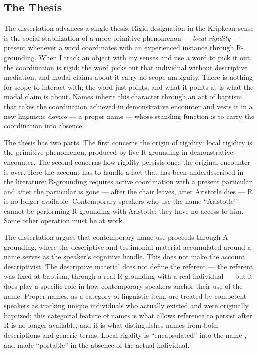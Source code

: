 \documentclass[12pt,a4paper]{article}
\begin{document}
\subsection{The Thesis}\label{the-thesis}

The dissertation advances a single thesis. Rigid designation in the Kripkean sense is the social stabilization of a more primitive phenomenon --- \emph{local rigidity} --- present whenever a word coordinates with an experienced instance through R-grounding. When I track an object with my senses and use a word to pick it out, the coordination is rigid: the word picks out that individual without descriptive mediation, and modal claims about it carry no scope ambiguity. There is nothing for scope to interact with; the word just points, and what it points at is what the modal claim is about. Names inherit this character through an act of baptism that takes the coordination achieved in demonstrative encounter and vests it in a new linguistic device --- a proper name --- whose standing function is to carry the coordination into absence.

The thesis has two parts. The first concerns the origin of rigidity: local rigidity is the primitive phenomenon, produced by live R-grounding in demonstrative encounter. The second concerns how rigidity persists once the original encounter is over. Here the account has to handle a fact that has been underdescribed in the literature: R-grounding requires active coordination with a present particular, and after the particular is gone --- after the chair leaves, after Aristotle dies --- R is no longer available. Contemporary speakers who use the name ``Aristotle'' cannot be performing R-grounding with Aristotle; they have no access to him. Some other operation must be at work.

The dissertation argues that contemporary name use proceeds through A-grounding, where the descriptive and testimonial material accumulated around a name serves as the speaker's cognitive handle. This does not make the account descriptivist. The descriptive material does not define the referent --- the referent was fixed at baptism, through a real R-grounding with a real individual --- but it does play a specific role in how contemporary speakers anchor their use of the name. Proper names, as a category of linguistic item, are treated by competent speakers as tracking unique individuals who actually existed and were originally baptized; this categorial feature of names is what allows reference to persist after R is no longer available, and it is what distinguishes names from both descriptions and generic terms. Local rigidity is ``encapsulated'' into the name , and made ``portable'' in the absence of the actual individual.
\end{document}
